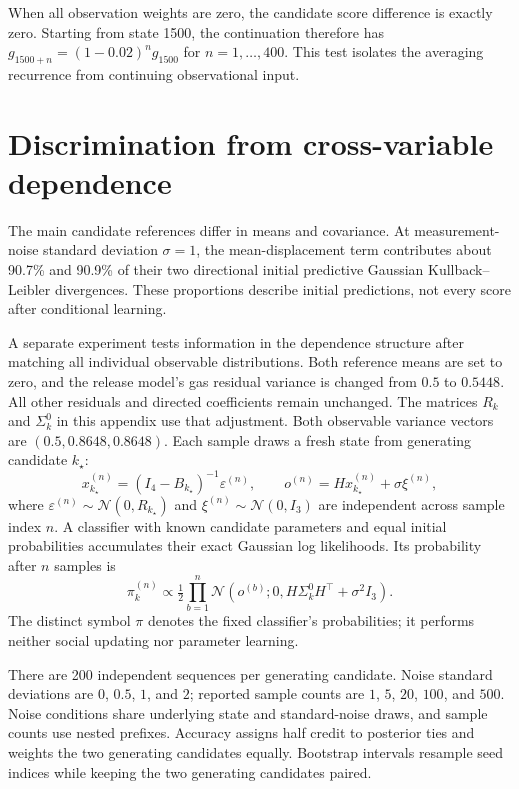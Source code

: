\documentclass[runningheads]{llncs}
\newcommand{\Normal}{\mathcal N}
\begin{document}
When all observation weights are zero, the candidate score difference is exactly
zero. Starting from state 1500, the continuation therefore has
$g_{1500+n}=(1-0.02)^n g_{1500}$ for $n=1,\ldots,400$.
This test isolates the averaging recurrence from continuing observational input.

\section{Discrimination from cross-variable dependence}
\label{app:dependence}
The main candidate references differ in means and covariance. At measurement-noise
standard deviation $\sigma=1$, the mean-displacement term contributes about
90.7\% and 90.9\% of their two directional initial predictive Gaussian
Kullback--Leibler divergences. These proportions describe initial predictions,
not every score after conditional learning.

A separate experiment tests information in the dependence structure after
matching all individual observable distributions. Both reference means are set
to zero, and the release model's gas residual variance is changed from $0.5$ to
$0.5448$. All other residuals and directed coefficients remain unchanged. The matrices
$R_k$ and $\Sigma_k^0$ in this appendix use that adjustment. Both observable
variance vectors are $(0.5,0.8648,0.8648)$.
Each sample draws a fresh state from generating candidate $k_\star$:
\begin{equation}
 x^{(n)}_{k_\star}=(I_4-B_{k_\star})^{-1}\varepsilon^{(n)},\qquad
 o^{(n)}=Hx^{(n)}_{k_\star}+\sigma\xi^{(n)},
 \label{eq:fresh-samples}
\end{equation}
where $\varepsilon^{(n)}\sim\Normal(0,R_{k_\star})$ and
$\xi^{(n)}\sim\Normal(0,I_3)$ are independent across sample index $n$.
A classifier with known candidate parameters and equal initial probabilities
accumulates their exact Gaussian log likelihoods. Its probability after $n$
samples is
\begin{equation}
 \pi_k^{(n)}\propto\tfrac12\prod_{b=1}^{n}
       \Normal(o^{(b)};0,H\Sigma_k^0H^\top+\sigma^2I_3).
 \label{eq:fixed-classifier}
\end{equation}
The distinct symbol $\pi$ denotes the fixed classifier's probabilities; it
performs neither social updating nor parameter learning.

There are 200 independent sequences per generating candidate. Noise standard
deviations are $0$, $0.5$, $1$, and $2$; reported sample counts are
$1$, $5$, $20$, $100$, and $500$. Noise conditions share underlying state and
standard-noise draws, and sample counts use nested prefixes. Accuracy assigns
half credit to posterior ties and weights the two generating candidates equally.
Bootstrap intervals resample seed indices while keeping the two generating
candidates paired.
\end{document}
